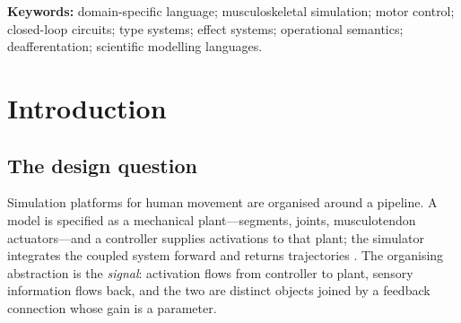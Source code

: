 \documentclass[11pt,twocolumn,a4paper]{article}
\theoremstyle{thmstyle}
\theoremstyle{definition}
\theoremstyle{remark}
\begin{document}
\begin{abstract}
prediction on every data set whatsoever and therefore has no null hypothesis.
We report the type separation statistic that determines when the
non-degenerate estimator has power, and specify the diagnostic that
distinguishes an uninformative model from a negative result. Three worked
programs---a stretch reflex, a postural loop under ablation, and a
cross-stratum coupling lesion---exercise every construct. A reference
implementation, exercised over ten programs yielding $257$ observations,
establishes that the language recovers clinical taxonomy from anatomy
alone---the upper/lower motor neuron distinction and the level-dependent
picture of spinal cord injury each follow from a membership test on declared
paths---and produces three statements not otherwise available: that regional
anaesthesia passes through a window in which contractile capacity is
preserved to full precision while the circulation is open, so coordination
fails without weakness; that surgical reinnervation restores closure through
a path $16$\,ms slower than the limb it replaces, so the repaired
circulation is not the original one; and that joint stiffness is an emergent
property of two coupled limit cycles rather than a commanded parameter.
\end{abstract}

\noindent\textbf{Keywords:} domain-specific language; musculoskeletal
simulation; motor control; closed-loop circuits; type systems; effect systems;
operational semantics; deafferentation; scientific modelling languages.

\tableofcontents

\section{Introduction}
\label{sec:intro}

\subsection{The design question}

Simulation platforms for human movement are organised around a pipeline. A
model is specified as a mechanical plant---segments, joints, musculotendon
actuators---and a controller supplies activations to that plant; the simulator
integrates the coupled system forward and returns trajectories
\citep{delp2007,seth2018,todorov2012}. The organising abstraction is the
\emph{signal}: activation flows from controller to plant, sensory information
flows back, and the two are distinct objects joined by a feedback connection
whose gain is a parameter.
\end{document}
